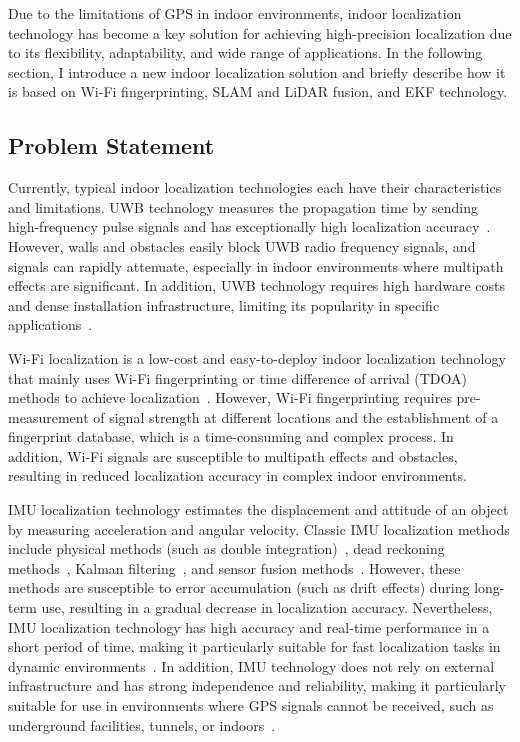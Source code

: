 \documentclass[12pt,a4paper]{article}
\numberwithin{equation}{section}
\begin{document}
Due to the limitations of GPS in indoor environments, indoor localization
technology has become a key solution for achieving high-precision localization
due to its flexibility, adaptability, and wide range of applications. In the
following section, I introduce a new indoor localization solution and briefly
describe how it is based on Wi-Fi fingerprinting, SLAM and LiDAR fusion, and EKF
technology.

\subsection{Problem Statement}
Currently, typical indoor localization technologies each have their
characteristics and limitations. UWB technology measures the propagation time by
sending high-frequency pulse signals and has exceptionally high localization
accuracy~\cite{fontana2004recent}. However, walls and obstacles easily block UWB
radio frequency signals, and signals can rapidly attenuate, especially in indoor
environments where multipath effects are significant. In addition, UWB
technology requires high hardware costs and dense installation infrastructure,
limiting its popularity in specific applications~\cite{farahsari2022survey}.

Wi-Fi localization is a low-cost and easy-to-deploy indoor localization
technology that mainly uses Wi-Fi fingerprinting or time difference of arrival
(TDOA) methods to achieve
localization~\cite{yiu2017wireless,gustafsson2003positioning}. However, Wi-Fi
fingerprinting requires pre-measurement of signal strength at different
locations and the establishment of a fingerprint database, which is a
time-consuming and complex process. In addition, Wi-Fi signals are susceptible
to multipath effects and obstacles, resulting in reduced localization accuracy
in complex indoor environments.

IMU localization technology estimates the displacement and attitude of an object
by measuring acceleration and angular velocity. Classic IMU localization methods
include physical methods (such as double integration)~\cite{yan2018ridi}, dead
reckoning methods~\cite{jirawimut2003method}, Kalman
filtering~\cite{caron2006gps}, and sensor fusion
methods~\cite{dehzangi2017imu}. However, these methods are susceptible to error
accumulation (such as drift effects) during long-term use, resulting in a
gradual decrease in localization accuracy. Nevertheless, IMU localization
technology has high accuracy and real-time performance in a short period of
time, making it particularly suitable for fast localization tasks in dynamic
environments~\cite{marins2001improved}. In addition, IMU technology does not
rely on external infrastructure and has strong independence and reliability,
making it particularly suitable for use in environments where GPS signals cannot
be received, such as underground facilities, tunnels, or
indoors~\cite{wu2015indoor}.
\end{document}

